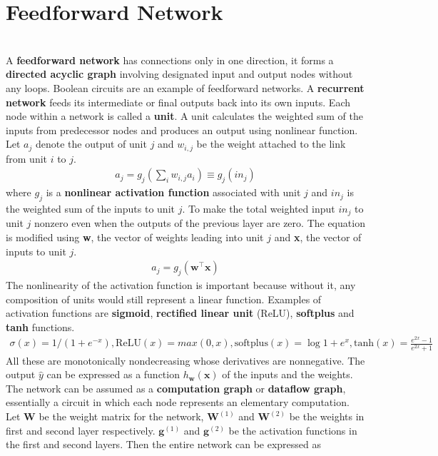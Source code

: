 \documentclass{article}
\begin{document}
\section{Feedforward Network}
\begin{paragraph}
\\
A \textbf{feedforward network} has connections only in one direction, it forms a \textbf{directed acyclic graph} involving designated input and output nodes without any loops. Boolean circuits are an example of feedforward networks. A \textbf{recurrent network} feeds its intermediate or final outputs back into its own inputs. Each node within a network is called a \textbf{unit}. A unit calculates the weighted sum of the inputs from predecessor nodes and produces an output using nonlinear function. Let $a_j$ denote the output of unit $j$
and $w_{i,j}$ be the weight attached to the link from unit $i$ to $j$.
\begin{align*}
    a_j = g_j(\sum\nolimits_i w_{i,j}a_i) \equiv g_j(in_j)
\end{align*}
where $g_j$ is a \textbf{nonlinear activation function} associated with unit $j$ and $in_j$ is the weighted sum of the inputs to unit $j$. To make the total
weighted input $in_j$ to unit $j$ nonzero even when the outputs of the previous layer are zero. The equation is modified using \textbf{w}, the vector of weights leading into unit $j$ and \textbf{x}, the vector of inputs to unit $j$.
\begin{align*}
    a_j = g_j(\textbf{w}^\top\textbf{x})
\end{align*}
The nonlinearity of the activation function is important because without it, 
any composition of units would still represent a linear function. Examples of activation functions are \textbf{sigmoid}, \textbf{rectified linear unit} (ReLU), \textbf{softplus} and \textbf{tanh} functions.
\begin{align*}
   \sigma(x) = 1/(1+e^{-x}), \text{ReLU}(x) = max(0, x), \text{softplus}(x) = \log{1 + e^x}, \text{tanh}(x) = \frac{e^{2x}-1}{e^{2x}+1}
\end{align*}
All these are monotonically nondecreasing whose derivatives are nonnegative. The output $\hat{y}$ can be expressed as a function $h_\textbf{w}(\textbf{x})$ of the inputs and the weights. The network can be assumed as a \textbf{computation graph} or \textbf{dataflow graph}, essentially a circuit in which each node represents an elementary computation. Let \textbf{W} be the weight matrix for the network, $\textbf{W}^{(1)}$ and $\textbf{W}^{(2)}$ be the weights in first and second layer respectively. $\textbf{g}^{(1)}$ and $\textbf{g}^{(2)}$ be the activation functions in the first and second layers. Then the entire network can be expressed as

\end{paragraph}
\end{document}

